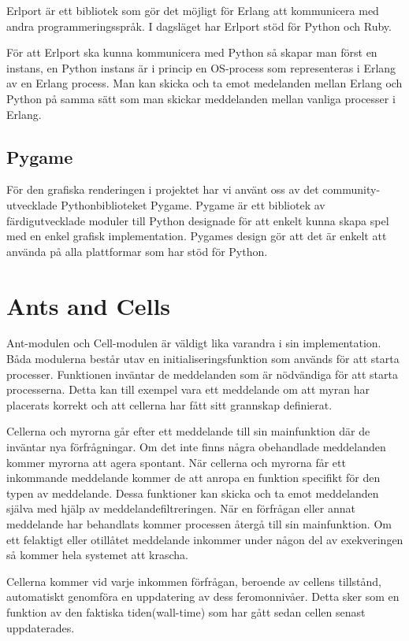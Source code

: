 Erlport är ett bibliotek som gör det möjligt för Erlang att kommunicera med andra programmeringsspråk. I dagsläget har Erlport stöd för Python och Ruby. 

För att Erlport ska kunna kommunicera med Python så skapar man först en instans, en Python instans är i princip en OS-process som representeras i Erlang av en Erlang process. Man kan skicka och ta emot medelanden mellan Erlang och Python på samma sätt som man skickar meddelanden mellan vanliga processer i Erlang.

\subsection{Pygame}

För den grafiska renderingen i projektet har vi använt oss av det community-utvecklade Pythonbiblioteket Pygame. Pygame är ett bibliotek av färdigutvecklade moduler till Python designade för att enkelt kunna skapa spel med en enkel grafisk implementation. Pygames design gör att det är enkelt att använda på alla plattformar som har stöd för Python.

\section{Ants and Cells}

Ant-modulen och Cell-modulen är väldigt lika varandra i sin implementation. Båda modulerna består utav en initialiseringsfunktion som används för att starta processer. Funktionen inväntar de meddelanden som är nödvändiga för att starta processerna. Detta kan till exempel vara ett meddelande om att myran har placerats korrekt och att cellerna har fått sitt grannskap definierat.

Cellerna och myrorna går efter ett meddelande till sin mainfunktion där de inväntar nya förfrågningar. Om det inte finns några obehandlade meddelanden kommer myrorna att agera spontant. När cellerna och myrorna får ett inkommande meddelande kommer de att anropa en funktion specifikt för den typen av meddelande. Dessa funktioner kan skicka och ta emot meddelanden själva med hjälp av meddelandefiltreringen. När en förfrågan eller annat meddelande har behandlats kommer processen återgå till sin mainfunktion. Om ett felaktigt eller otillåtet meddelande inkommer under någon del av exekveringen så kommer hela systemet att krascha.

Cellerna kommer vid varje inkommen förfrågan, beroende av cellens tillstånd, automatiskt genomföra en uppdatering av dess feromonnivåer. Detta sker som en funktion av den faktiska tiden(wall-time) som har gått sedan cellen senast uppdaterades.

